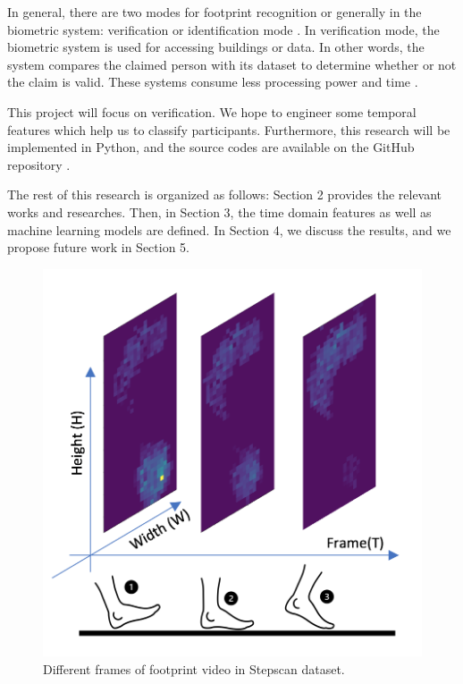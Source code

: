 In general, there are two modes for footprint recognition or generally in the biometric system: verification or identification mode \cite{Jain2004AnRecognition}. In verification mode, the biometric system is used for accessing buildings or data. In other words, the system compares the claimed person with its dataset to determine whether or not the claim is valid. These systems consume less processing power and time \cite{Jain2004AnRecognition}. 


This project will focus on verification. We hope to engineer some temporal features which help us to classify participants. Furthermore, this research will be implemented in Python, and the source codes are available on the GitHub repository \cite{SKazemii/EE6563}.  

The rest of this research is organized as follows: Section 2 provides the relevant works and researches. Then, in Section 3, the time domain features as well as machine learning models are defined. In Section 4, we discuss the results, and we propose future work in Section 5.

\begin{figure}
    \centering
    \begin{minipage}[b]{.5\textwidth}
        \includegraphics[width=\textwidth]{figures/project/frame2.png}
    \end{minipage}
    \caption{Different frames of footprint video in Stepscan dataset.}
    \label{fig:Stepscan_dataset}
\end{figure}


